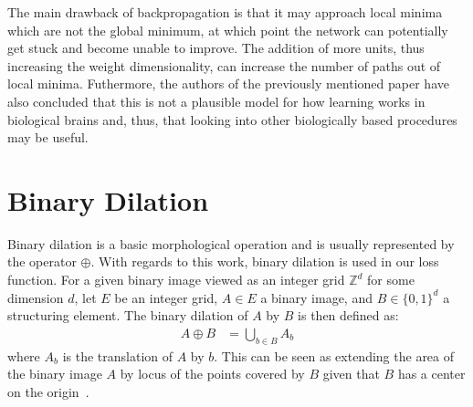 The main drawback of backpropagation is that it may approach local minima which are not the global minimum, at which point the network can potentially get stuck and become unable to improve.
The addition of more units, thus increasing the weight dimensionality, can increase the number of paths out of local minima.
Futhermore, the authors of the previously mentioned paper have also concluded that this is not a plausible model for how learning works in biological brains and, thus, that looking into other biologically based procedures may be useful.



\section{Binary Dilation}\label{section:background-dilation}
Binary dilation is a basic morphological operation and is usually represented by the operator $\oplus$.
With regards to this work, binary dilation is used in our loss function.
For a given binary image viewed as an integer grid $\mathbb{Z}^d$ for some dimension $d$, let $E$ be an integer grid, $A \in E$ a binary image, and $B \in \{0,1\}^d$ a structuring element.
The binary dilation of $A$ by $B$ is then defined as:
\begin{align}
	A \oplus B &= \bigcup_{b \in B}A_b
\end{align}
where $A_b$ is the translation of $A$ by $b$.
This can be seen as extending the area of the binary image $A$ by locus of the points covered by $B$ given that $B$ has a center on the origin~\cite{morphology}.